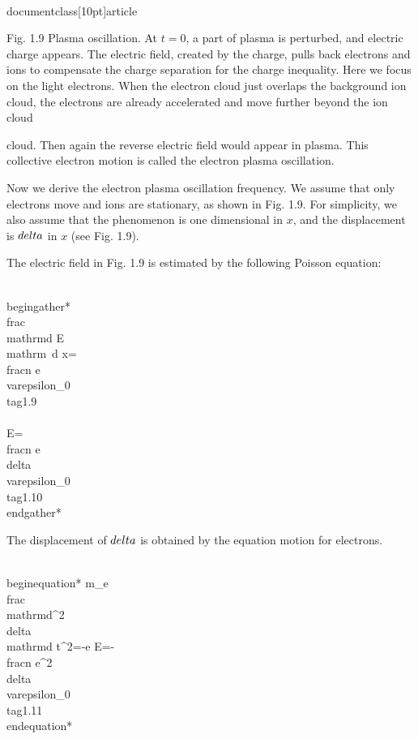 \\documentclass[10pt]{article}
\begin{document}
Fig. 1.9 Plasma oscillation. At $t=0$, a part of plasma is perturbed, and electric charge appears. The electric field, created by the charge, pulls back electrons and ions to compensate the charge separation for the charge inequality. Here we focus on the light electrons. When the electron cloud just overlaps the background ion cloud, the electrons are already accelerated and move further beyond the ion cloud

cloud. Then again the reverse electric field would appear in plasma. This collective electron motion is called the electron plasma oscillation.

Now we derive the electron plasma oscillation frequency. We assume that only electrons move and ions are stationary, as shown in Fig. 1.9. For simplicity, we also assume that the phenomenon is one dimensional in $x$, and the displacement is $\\delta$ in $x$ (see Fig. 1.9).

The electric field in Fig. 1.9 is estimated by the following Poisson equation:


\\begin{gather*}
\\frac{\\mathrm{d} E}{\\mathrm{~d} x}=\\frac{n e}{\\varepsilon_{0}}  \\tag{1.9}\\\\
E=\\frac{n e \\delta}{\\varepsilon_{0}} \\tag{1.10}
\\end{gather*}


The displacement of $\\delta$ is obtained by the equation motion for electrons.


\\begin{equation*}
m_{e} \\frac{\\mathrm{d}^{2} \\delta}{\\mathrm{d} t^{2}}=-e E=-\\frac{n e^{2} \\delta}{\\varepsilon_{0}} \\tag{1.11}
\\end{equation*}
\end{document}
